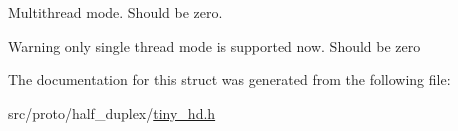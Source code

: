 Multithread mode. Should be zero. 

\begin{DoxyWarning}{Warning}
only single thread mode is supported now. Should be zero 
\end{DoxyWarning}


The documentation for this struct was generated from the following file\+:\begin{DoxyCompactItemize}
\item 
src/proto/half\+\_\+duplex/\hyperlink{tiny__hd_8h}{tiny\+\_\+hd.\+h}\end{DoxyCompactItemize}
